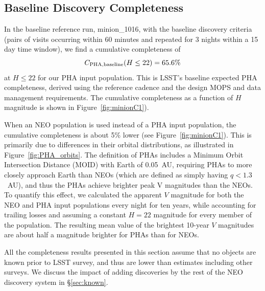 \subsection{Baseline Discovery Completeness}

In the baseline reference run, minion\_1016, with the baseline discovery
criteria (pairs of visits occurring within 60 minutes and
repeated for 3 nights within a 15 day time window), we find a cumulative
completeness of
\begin{equation}
C_{\rm PHA, baseline}(H\le22) = 65.6\%
\end{equation}
at $H\le22$ for our PHA input population. This is LSST's baseline expected PHA completeness, derived using the reference cadence and the design MOPS and data management requirements. The cumulative completeness as a function of $H$ magnitude is shown in Figure~\ref{fig:minionC1}). 

When an NEO population is used instead of a PHA input population, the cumulative completeness is about 5\% lower
(see Figure~\ref{fig:minionC1}). This is primarily due to differences in their orbital distributions, as illustrated in Figure~\ref{fig:PHA_orbits}. The definition of PHAs includes a Minimum Orbit Intersection Distance (MOID) with Earth of 0.05~AU, requiring PHAs to more closely approach Earth than NEOs (which are defined as simply having $q<1.3$~AU), and thus the PHAs achieve brighter peak V magnitudes than the NEOs. To quantify this effect, we calculated the apparent $V$ magnitude for both the NEO and PHA input populations every night for ten years, while accounting for trailing losses and assuming a constant $H=22$ magnitude for every member of the population. The resulting mean value of the
brightest 10-year $V$ magnitudes are about half a magnitude brighter for PHAs than for NEOs.

All the completeness results presented in this section assume that no objects are known prior to LSST survey,
and thus are lower than estimates including other surveys. We discuss the impact of adding discoveries by the 
rest of the NEO discovery system in \S\ref{sec:known}. 

